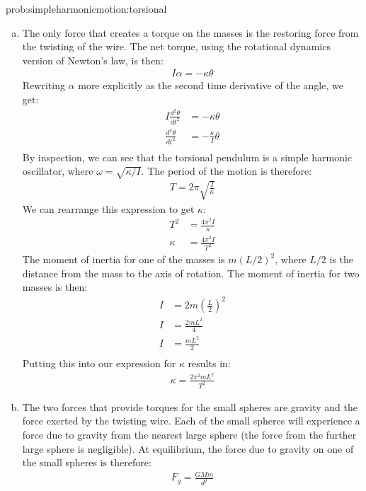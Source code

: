 \begin{solution}{prob:simpleharmonicmotion:torsional}\label{soln:simpleharmonicmotion:torsional}
\begin{enumerate}[(a)]
\item The only force that creates a torque on the masses is the restoring force from the twisting of the wire. The net torque, using the rotational dynamics version of Newton's law, is then:
\begin{align*}
I\alpha=-\kappa\theta
\end{align*}
Rewriting $\alpha$ more explicitly as the second time derivative of the angle, we get:
\begin{align*}
I\frac{d^2\theta}{dt^2}&=-\kappa\theta\\
\frac{d^2\theta}{dt^2}&=-\frac{\kappa}{I}\theta\\
\end{align*}
By inspection, we can see that the torsional pendulum is a simple harmonic oscillator, where $\omega=\sqrt{\kappa/I}$. The period of the motion is therefore:
\begin{align*}
T=2\pi\sqrt{\frac{I}{\kappa}}
\end{align*}
We can rearrange this expression to get $\kappa$:
\begin{align*}
T^2&=\frac{4\pi^2I}{\kappa}\\
\kappa&=\frac{4\pi^2I}{T^2}
\end{align*}
The moment of inertia for one of the masses is $m(L/2)^2$, where $L/2$ is the distance from the mass to the axis of rotation. The moment of inertia for two masses is then:
\begin{align*}
I&=2m(\frac{L}{2})^2\\
I&=\frac{2mL^2}{4}\\
I&=\frac{mL^2}{2}\\
\end{align*}
Putting this into our expression for $\kappa$ results in:
\begin{align*}
\kappa=\frac{2\pi^2mL^2}{T^2}
\end{align*}
\item The two forces that provide torques for the small spheres are gravity and the force exerted by the twisting wire. Each of the small spheres will experience a force due to gravity from the nearest large sphere (the force from the further large sphere is negligible). At equilibrium, the force due to gravity on one of the small spheres is therefore:
\begin{align*}
F_g=\frac{GMm}{d^2}

\end{align*}
\end{enumerate}
\end{solution}
